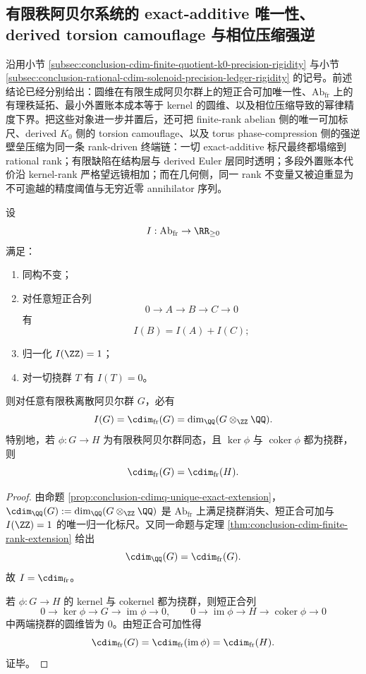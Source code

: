 \subsection{有限秩阿贝尔系统的 exact-additive 唯一性、derived torsion camouflage 与相位压缩强逆}\label{subsec:conclusion-finite-rank-derived-phase-strongconverse}
沿用小节 \ref{subsec:conclusion-cdim-finite-quotient-k0-precision-rigidity} 与小节 \ref{subsec:conclusion-rational-cdim-solenoid-precision-ledger-rigidity} 的记号。前述结论已经分别给出：圆维在有限生成阿贝尔群上的短正合可加唯一性、\(\mathrm{Ab}_{\mathrm{fr}}\) 上的有理秩延拓、最小外置账本成本等于 kernel 的圆维、以及相位压缩导致的幂律精度下界。把这些对象进一步并置后，还可把 finite-rank abelian 侧的唯一可加标尺、derived \(K_0\) 侧的 torsion camouflage、以及 torus phase-compression 侧的强逆壁垒压缩为同一条 rank-driven 终端链：一切 exact-additive 标尺最终都塌缩到 rational rank；有限缺陷在结构层与 derived Euler 层同时透明；多段外置账本代价沿 kernel-rank 严格望远镜相加；而在几何侧，同一 rank 不变量又被迫重显为不可逾越的精度阈值与无穷近零 annihilator 序列。

\begin{theorem}\label{thm:conclusion-finite-rank-exact-additive-unique-extension}
设
\[
I:\mathrm{Ab}_{\mathrm{fr}}\to \RR_{\ge 0}
\]
满足：
\begin{enumerate}
  \item 同构不变；
  \item 对任意短正合列
  \[
  0\to A\to B\to C\to 0
  \]
  有
  \[
  I(B)=I(A)+I(C);
  \]
  \item 归一化 \(I(\ZZ)=1\)；
  \item 对一切挠群 \(T\) 有 \(I(T)=0\)。
\end{enumerate}
则对任意有限秩离散阿贝尔群 \(G\)，必有
\[
I(G)=\cdim_{\mathrm{fr}}(G)=\dim_{\QQ}(G\otimes_{\ZZ}\QQ).
\]
特别地，若 \(\phi:G\to H\) 为有限秩阿贝尔群同态，且 \(\ker\phi\) 与 \(\operatorname{coker}\phi\) 都为挠群，则
\[
\cdim_{\mathrm{fr}}(G)=\cdim_{\mathrm{fr}}(H).
\]
\end{theorem}
\begin{proof}
由命题 \ref{prop:conclusion-cdimq-unique-exact-extension}，\(\cdim_{\QQ}(G):=\dim_{\QQ}(G\otimes_{\ZZ}\QQ)\) 是 \(\mathrm{Ab}_{\mathrm{fr}}\) 上满足挠群消失、短正合可加与 \(I(\ZZ)=1\) 的唯一归一化标尺。又同一命题与定理 \ref{thm:conclusion-cdim-finite-rank-extension} 给出
\[
\cdim_{\QQ}(G)=\cdim_{\mathrm{fr}}(G).
\]
故 \(I=\cdim_{\mathrm{fr}}\)。

若 \(\phi:G\to H\) 的 kernel 与 cokernel 都为挠群，则短正合列
\[
0\to \ker\phi\to G\to \operatorname{im}\phi\to 0,
\qquad
0\to \operatorname{im}\phi\to H\to \operatorname{coker}\phi\to 0
\]
中两端挠群的圆维皆为 \(0\)。由短正合可加性得
\[
\cdim_{\mathrm{fr}}(G)=\cdim_{\mathrm{fr}}(\operatorname{im}\phi)=\cdim_{\mathrm{fr}}(H).
\]
证毕。
\end{proof}

